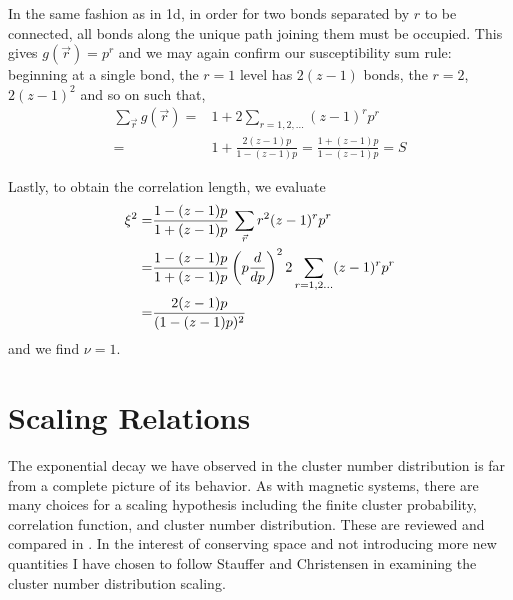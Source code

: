 In the same fashion as in 1d, in order
for two bonds separated by $r$ to be connected, all bonds along the unique path
joining them must be occupied.  This gives $g(\vec{r}) = p^r$ and we may again
confirm our susceptibility sum rule: beginning at a single
bond, the $r=1$ level has $2(z-1)$ bonds, the $r=2$, $2(z-1)^2$ and so on such that,
\begin{align*}
\sum_{\vec{r}}g(\vec{r}) =& 1 + 2 \sum_{r=1,2,...} (z-1)^r p^r \\
=& 1 + \frac{2(z-1)p}{1 - (z-1)p} = \frac{1 + (z-1)p}{1 - (z-1)p} = S
\end{align*}

Lastly, to obtain the correlation length, we evaluate
\begin{align*}
\xi^2 =& \frac{1-(z-1)p}{1+(z-1)p}\:\sum_{\vec{r}}r^2(z-1)^rp^r \\
=& \frac{1-(z-1)p}{1+(z-1)p}\left(p\frac{d }{d p}\right)^2 2\sum_{r=1,2...}(z-1)^rp^r \\
=& \frac{2(z-1)p}{(1-(z-1)p)^2}
\end{align*}
and we find $\nu = 1$.


\section{Scaling Relations}

The exponential decay we have observed in the cluster number distribution is far
from a complete picture of its behavior. As with magnetic systems, there are many
choices for a scaling hypothesis including the finite cluster probability, correlation
function, and cluster number distribution.  These are reviewed and compared in
\cite{Essam1980}. In the interest of conserving space and not introducing
more new quantities I have chosen to follow Stauffer and Christensen in examining
the cluster number distribution scaling.

